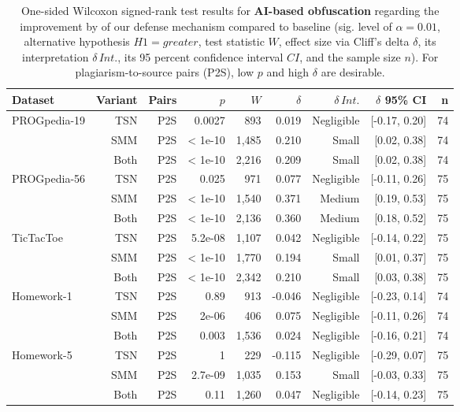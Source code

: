 \begin{table}[h]
\centering
\small
\begin{tabular}{lrrrrrrrr}
  \toprule
Dataset & Variant & Pairs & $p$ & $W$ & $\delta$ & $\delta\,Int.$ & $\delta$ 95\% CI & n \\ 
  \midrule 
   \multirow{3}{*}{{PROGpedia-19}} & TSN & P2S & 0.0027 & 893 & 0.019 & Negligible & [-0.17, 0.20] & 74 \\ 
   & SMM & P2S & < 1e-10 & 1,485 & 0.210 & Small & [0.02, 0.38] & 74 \\ 
   & Both & P2S & < 1e-10 & 2,216 & 0.209 & Small & [0.02, 0.38] & 74 \\ 
      \hline 
   \multirow{3}{*}{{PROGpedia-56}} & TSN & P2S & 0.025 & 971 & 0.077 & Negligible & [-0.11, 0.26] & 75 \\ 
   & SMM & P2S & < 1e-10 & 1,540 & 0.371 & Medium & [0.19, 0.53] & 75 \\ 
   & Both & P2S & < 1e-10 & 2,136 & 0.360 & Medium & [0.18, 0.52] & 75 \\ 
      \hline
   \multirow{3}{*}{{TicTacToe}} & TSN & P2S & 5.2e-08 & 1,107 & 0.042 & Negligible & [-0.14, 0.22] & 75 \\ 
   & SMM & P2S & < 1e-10 & 1,770 & 0.194 & Small & [0.01, 0.37] & 75 \\ 
   & Both & P2S & < 1e-10 & 2,342 & 0.210 & Small & [0.03, 0.38] & 75 \\ 
      \hline
   \multirow{3}{*}{{Homework-1}} & TSN & P2S & 0.89 & 913 & -0.046 & Negligible & [-0.23, 0.14] & 74 \\ 
   & SMM & P2S & 2e-06 & 406 & 0.075 & Negligible & [-0.11, 0.26] & 74 \\ 
   & Both & P2S & 0.003 & 1,536 & 0.024 & Negligible & [-0.16, 0.21] & 74 \\ 
      \hline
   \multirow{3}{*}{{Homework-5}}& TSN & P2S & 1 & 229 & -0.115 & Negligible & [-0.29, 0.07] & 75 \\ 
   & SMM & P2S & 2.7e-09 & 1,035 & 0.153 & Small & [-0.03, 0.33] & 75 \\ 
   & Both & P2S & 0.11 & 1,260 & 0.047 & Negligible & [-0.14, 0.23] & 75 \\ 
   \bottomrule
\end{tabular}
\caption[Statistical Tests: AI-based Obfuscation]{One-sided Wilcoxon signed-rank test results for \textbf{AI-based obfuscation} regarding the improvement by of our defense mechanism compared to baseline (sig. level of $\alpha=0.01$, alternative hypothesis $H1=greater$, test statistic $W$, effect size via Cliff's delta $\delta$, its interpretation $\delta\,Int.$, its 95 percent confidence interval $CI$, and the sample size $n$). For plagiarism-to-source pairs (P2S), low $p$ and high $\delta$ are desirable.} 
\label{tab:to-base-gpt-obf}
\end{table}
